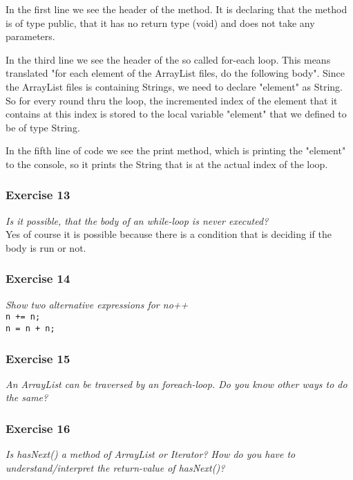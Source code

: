In the first line we see the header of the method. It is declaring that the
method is of type public, that it has no return type (void) and does not 
take any parameters.

In the third line we see the header of the so called for-each loop. This
means translated "for each element of the ArrayList files, do the following
body". Since the ArrayList files is containing Strings, we need to declare
"element" as String. So for every round thru the loop, the incremented index
of the element that it contains at this index is stored to the local variable
"element" that we defined to be of type String.

In the fifth line of code we see the print method, which is printing the
"element" to the console, so it prints the String that is at the actual
index of the loop.

\subsubsection*{Exercise 13}
\textit{Is it possible, that the body of an while-loop is never executed?}\\

Yes of course it is possible because there is a condition that is deciding
if the body is run or not.

\subsubsection*{Exercise 14}
\textit{Show two alternative expressions for no++}\\

\lstinline{n += n;}\\

\lstinline{n = n + n;}

\subsubsection*{Exercise 15}
\textit{An ArrayList can be traversed by an foreach-loop. Do you know other
ways to do the same?}\\

\subsubsection*{Exercise 16}
\textit{Is hasNext() a method of ArrayList or Iterator? How do you have to 
understand/interpret the return-value of hasNext()?}\\


